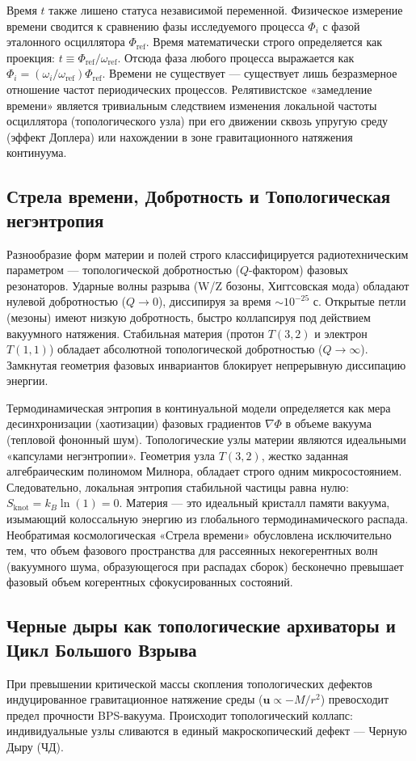 \documentclass[12pt,a4paper]{article}
\begin{document}
Время $t$ также лишено статуса независимой переменной. Физическое измерение времени сводится к сравнению фазы исследуемого процесса $\Phi_i$ с фазой эталонного осциллятора $\Phi_{\text{ref}}$. Время математически строго определяется как проекция: $t \equiv \Phi_{\text{ref}} / \omega_{\text{ref}}$. Отсюда фаза любого процесса выражается как $\Phi_i = (\omega_i / \omega_{\text{ref}}) \Phi_{\text{ref}}$. 
Времени не существует — существует лишь безразмерное отношение частот периодических процессов. Релятивистское «замедление времени» является тривиальным следствием изменения локальной частоты осциллятора (топологического узла) при его движении сквозь упругую среду (эффект Доплера) или нахождении в зоне гравитационного натяжения континуума.

\subsection{Стрела времени, Добротность и Топологическая негэнтропия}
Разнообразие форм материи и полей строго классифицируется радиотехническим параметром — топологической добротностью ($Q$-фактором) фазовых резонаторов. 
Ударные волны разрыва (W/Z бозоны, Хиггсовская мода) обладают нулевой добротностью ($Q \to 0$), диссипируя за время $\sim 10^{-25}$ с. Открытые петли (мезоны) имеют низкую добротность, быстро коллапсируя под действием вакуумного натяжения. 
Стабильная материя (протон $T(3,2)$ и электрон $T(1,1)$) обладает абсолютной топологической добротностью ($Q \to \infty$). Замкнутая геометрия фазовых инвариантов блокирует непрерывную диссипацию энергии.

Термодинамическая энтропия в континуальной модели определяется как мера десинхронизации (хаотизации) фазовых градиентов $\nabla \Phi$ в объеме вакуума (тепловой фононный шум). 
Топологические узлы материи являются идеальными «капсулами негэнтропии». Геометрия узла $T(3,2)$, жестко заданная алгебраическим полиномом Милнора, обладает строго одним микросостоянием. Следовательно, локальная энтропия стабильной частицы равна нулю: $S_{\text{knot}} = k_B \ln(1) = 0$. Материя — это идеальный кристалл памяти вакуума, изымающий колоссальную энергию из глобального термодинамического распада. 
Необратимая космологическая «Стрела времени» обусловлена исключительно тем, что объем фазового пространства для рассеянных некогерентных волн (вакуумного шума, образующегося при распадах сборок) бесконечно превышает фазовый объем когерентных сфокусированных состояний. 

\subsection{Черные дыры как топологические архиваторы и Цикл Большого Взрыва}
При превышении критической массы скопления топологических дефектов индуцированное гравитационное натяжение среды ($\mathbf{u} \propto -M/r^2$) превосходит предел прочности BPS-вакуума. Происходит топологический коллапс: индивидуальные узлы сливаются в единый макроскопический дефект — Черную Дыру (ЧД). 
\end{document}
